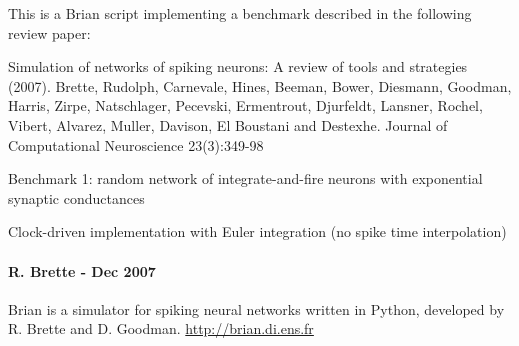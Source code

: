 \documentclass[letterpaper,10pt,english]{manual}
\begin{document}
This is a Brian script implementing a benchmark described
in the following review paper:

Simulation of networks of spiking neurons: A review of tools and strategies (2007).
Brette, Rudolph, Carnevale, Hines, Beeman, Bower, Diesmann, Goodman, Harris, Zirpe,
Natschlager, Pecevski, Ermentrout, Djurfeldt, Lansner, Rochel, Vibert, Alvarez, Muller,
Davison, El Boustani and Destexhe.
Journal of Computational Neuroscience 23(3):349-98

Benchmark 1: random network of integrate-and-fire neurons with exponential synaptic conductances

Clock-driven implementation with Euler integration
(no spike time interpolation)


\paragraph{R. Brette - Dec 2007}

Brian is a simulator for spiking neural networks written in Python, developed by
R. Brette and D. Goodman.
\href{http://brian.di.ens.fr}{http://brian.di.ens.fr}
\end{document}

